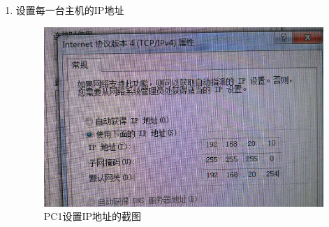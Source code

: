 \documentclass{myreport}
\begin{document}
\begin{enumerate}
    \item 设置每一台主机的IP地址
    \begin{figure}[htp]
        \centering
        \includegraphics[width=13cm]{"./figure/2018-05-17-22-31-49.png"}
        \caption{PC1设置IP地址的截图}
        \label{fig:e2-s2-set-ip}
    \end{figure}
    

\end{enumerate}
\end{document}

